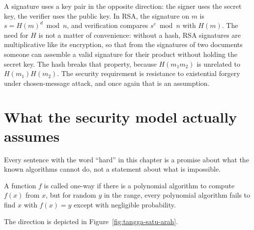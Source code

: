 A signature uses a key pair in the opposite direction: the signer uses the secret key, the verifier
uses the public key. In RSA, the signature on $m$ is $s=H(m)^d\bmod n$, and verification compares
$s^e\bmod n$ with $H(m)$. The need for $H$ is not a matter of convenience: without a hash, RSA
signatures are multiplicative like its encryption, so that from the signatures of two documents
someone can assemble a valid signature for their product without holding the secret key. The hash
breaks that property, because $H(m_1m_2)$ is unrelated to $H(m_1)H(m_2)$. The security requirement is
resistance to existential forgery under chosen-message attack, and once again that is an assumption.


\section{What the security model actually assumes}

Every sentence with the word ``hard'' in this chapter is a promise about what the known algorithms
cannot do, not a statement about what is impossible.

\begin{definisi}
A function $f$ is called one-way if there is a polynomial algorithm to compute $f(x)$ from $x$, but
for random $y$ in the range, every polynomial algorithm fails to find $x$ with $f(x)=y$ except with
negligible probability.
\end{definisi}

The direction is depicted in Figure~\ref{fig:tangga-satu-arah}.

